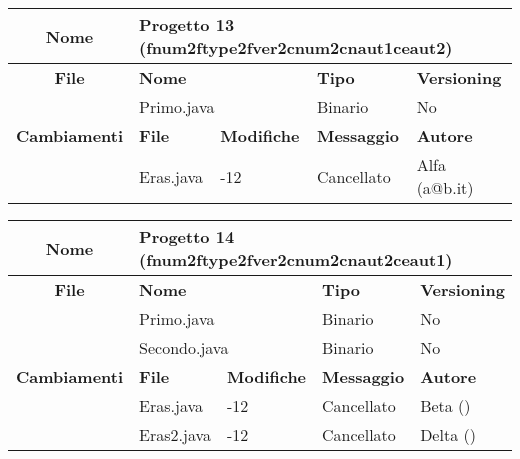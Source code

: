 \begin{table}[ht]
\footnotesize
\begin{tabular}{|c|p{2.5cm}|p{2cm}|p{2.5cm}|p{2.5cm}|}
  \hline
  \textbf{Nome}	& \multicolumn{4}{l|}{Progetto 13 (fnum2ftype2fver2cnum2cnaut1ceaut2)} 									\\
  \hline
  \rowcolor{lightgray}\textbf{File} 		& \multicolumn{2}{l|}{\textbf{Nome}}		& \textbf{Tipo}		& \textbf{Versioning} 		\\
						\cline{2-5}
						& \multicolumn{2}{l|}{Primo.java}		& Binario		& No				\\
  \hline
  \rowcolor{lightgray}\textbf{Cambiamenti}	& \textbf{File}		&\textbf{Modifiche}	& \textbf{Messaggio}	& \textbf{Autore}		\\
						\cline{2-5}
						& Eras.java		& -12	  		& Cancellato		& Alfa (a@b.it)			\\
						
  \hline
\end{tabular}
\end{table}

\begin{table}[ht]
\footnotesize
\begin{tabular}{|c|p{2.5cm}|p{2cm}|p{2.5cm}|p{2.5cm}|}
  \hline
  \textbf{Nome}	& \multicolumn{4}{l|}{Progetto 14 (fnum2ftype2fver2cnum2cnaut2ceaut1)} 									\\
  \hline
  \rowcolor{lightgray}\textbf{File} 		& \multicolumn{2}{l|}{\textbf{Nome}}		& \textbf{Tipo}		& \textbf{Versioning} 		\\
						\cline{2-5}
						& \multicolumn{2}{l|}{Primo.java}		& Binario		& No				\\
						\cline{2-5}
						& \multicolumn{2}{l|}{Secondo.java}		& Binario		& No				\\
  \hline
  \rowcolor{lightgray}\textbf{Cambiamenti}	& \textbf{File}		&\textbf{Modifiche}	& \textbf{Messaggio}	& \textbf{Autore}		\\
						\cline{2-5}
						& Eras.java		& -12	  		& Cancellato		& Beta ()			\\
						\cline{2-5}
						& Eras2.java		& -12	  		& Cancellato		& Delta ()			\\
  \hline
\end{tabular}
\end{table}

